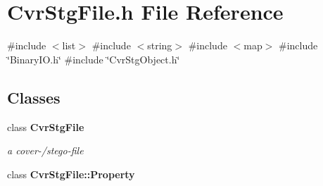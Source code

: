 \section{Cvr\+Stg\+File.\+h File Reference}
\label{CvrStgFile_8h}
{\ttfamily \#include $<$list$>$}\newline
{\ttfamily \#include $<$string$>$}\newline
{\ttfamily \#include $<$map$>$}\newline
{\ttfamily \#include \char`\"{}Binary\+I\+O.\+h\char`\"{}}\newline
{\ttfamily \#include \char`\"{}Cvr\+Stg\+Object.\+h\char`\"{}}\newline
\subsection*{Classes}
\begin{DoxyCompactItemize}
\item 
class \textbf{ Cvr\+Stg\+File}
\begin{DoxyCompactList}\small\item\em a cover-\//stego-\/file \end{DoxyCompactList}\item 
class \textbf{ Cvr\+Stg\+File\+::\+Property}
\end{DoxyCompactItemize}
